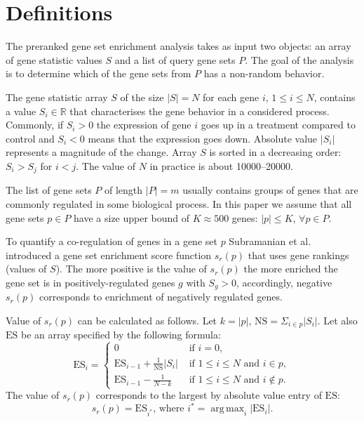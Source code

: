 \documentclass[runningheads,a4paper]{llncs}
\DeclareMathOperator*{\argmax}{arg\,max}
\begin{document}
\section{Definitions}\label{section_definitions}

The preranked gene set enrichment analysis takes as input two objects:
an array of gene statistic values $S$ and a list of query gene sets $P$.
The goal of the analysis is to determine which of the gene sets from $P$
has a non-random behavior.

The gene statistic array $S$ of the size $|S| = N$ for each gene
$i$,  $1 \le i \le N$, contains a value $S_i \in \mathbb{R}$ 
that characterises the gene behavior in a considered process.
Commonly, if $S_i > 0$ the expression of gene $i$ goes up in a treatment
compared to 
control and $S_i < 0$ means that the expression goes down. Absolute value 
$|S_i|$ represents a magnitude of the change. Array $S$ is
sorted in a decreasing order: $S_i > S_j$ for $i < j$. 
The value of $N$ in practice is about 10000--20000.

The list of gene sets $P$ of length $|P| = m$ usually contains groups of 
genes that are commonly regulated in some biological process.
In this
paper we assume that all gene sets $p \in P$ have a size upper bound
of $K \approx 500$ genes: $|p| \le K$, $\forall p \in P$.

To quantify a co-regulation of genes in a gene set $p$ Subramanian et al.
introduced a gene set enrichment score function $s_r(p)$ that uses
gene rankings (values of $S$).
The more positive is the value of 
$s_r(p)$ the more enriched the gene set is in positively-regulated
genes $g$ with $S_g > 0$, accordingly, negative $s_r(p)$ corresponds
to enrichment of negatively regulated genes.

Value of $s_r(p)$ can be calculated as follows. Let $k = |p|$, 
$\mathrm{NS} = \Sigma_{i \in p} |S_i|$. Let also $\mathrm{ES}$ be an array 
specified by the following formula: 
\[ \mathrm{ES}_i = \begin{cases} 
        0 & \text{ if } i = 0, \\
        \mathrm{ES}_{i-1} + \frac{1}{\mathrm{NS}} |S_i| & \text{ if } 1 \le i \le N  \text{ and } i \in p, \\
        \mathrm{ES}_{i-1} - \frac{1}{N-k} & \text{ if } 1 \le i \le N \text{ and } i \not \in p.
   \end{cases}
\]
The value of $s_r(p)$ corresponds to the largest by absolute value entry
of $\mathrm{ES}$:
\[
s_r(p) = \mathrm{ES}_{i^*} \text{, where } i^* =  \argmax_i |\mathrm{ES}_i|.
\]
\end{document}
